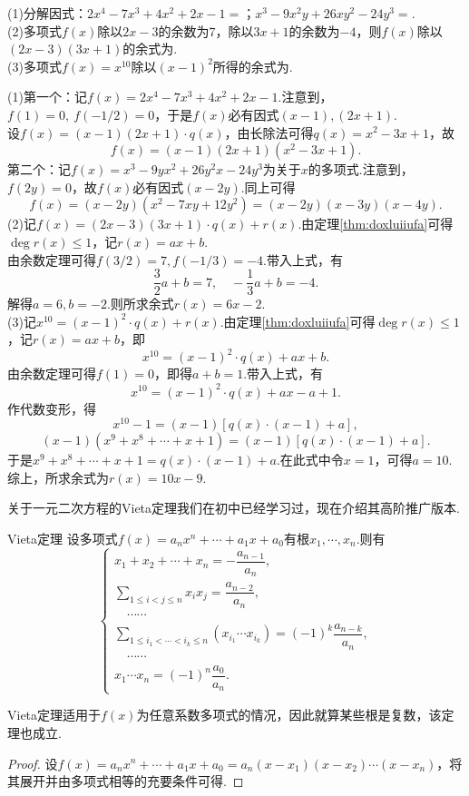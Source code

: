 \documentclass[lang=cn, zihao=5]{elegantbook}
\newcommand{\tk}{\uline{\hspace{4em}}}
\begin{document}
\begin{example}
	(1)分解因式：$2x^4-7x^3+4x^2+2x-1=$\tk ；$x^3-9x^2y+26xy^2-24y^3=$\tk . \\
	(2)多项式$f(x)$除以$2x-3$的余数为$7$，除以$3x+1$的余数为$-4$，则$f(x)$除以$(2x-3)(3x+1)$的余式为\tk . \\
	(3)多项式$f(x)=x^{10}$除以$(x-1)^2$所得的余式为\tk .
\end{example}
\begin{solution}
	(1)第一个：记$f(x)=2x^4-7x^3+4x^2+2x-1$.注意到，$f(1)=0,~f(-1/2)=0$，于是$f(x)$必有因式$(x-1),(2x+1)$. \\
	设$f(x)=(x-1)(2x+1) \cdot q(x)$，由长除法可得$q(x)=x^2-3x+1$，故$$f(x)=(x-1)(2x+1)(x^2-3x+1).$$
	第二个：记$f(x)=x^3-9yx^2+26y^2x-24y^3$为关于$x$的多项式.注意到，$f(2y)=0$，故$f(x)$必有因式$(x-2y)$.同上可得$$f(x)=(x-2y)(x^2-7xy+12y^2)=(x-2y)(x-3y)(x-4y).$$
	(2)记$f(x)=(2x-3)(3x+1) \cdot q(x) + r(x)$.由定理\ref{thm:doxluiiufa}可得$\deg r(x) \leq 1$，记$r(x)=ax+b$. \\
	由余数定理可得$f(3/2)=7,f(-1/3)=-4$.带入上式，有$$\frac{3}{2}a+b=7,\quad -\frac{1}{3}a+b=-4.$$
	解得$a=6,b=-2$.则所求余式$r(x)=6x-2$. \\
	(3)记$x^{10}=(x-1)^2 \cdot q(x) + r(x)$.由定理\ref{thm:doxluiiufa}可得$\deg r(x) \leq 1$，记$r(x)=ax+b$，即$$x^{10} = (x-1)^2 \cdot q(x) + ax+b.$$
	由余数定理可得$f(1)=0$，即得$a+b=1$.带入上式，有$$x^{10} = (x-1)^2 \cdot q(x) + ax-a+1.$$
	作代数变形，得
	$$x^{10}-1 = (x-1)[q(x) \cdot (x-1)+a],$$
	$$(x-1)(x^9+x^8+ \cdots +x+1) = (x-1)[q(x) \cdot (x-1)+a].$$
	于是$x^9+x^8+ \cdots +x+1 = q(x) \cdot (x-1)+a$.在此式中令$x=1$，可得$a=10$. \\
	综上，所求余式为$r(x)=10x-9$.
\end{solution}

关于一元二次方程的Vieta定理我们在初中已经学习过，现在介绍其高阶推广版本.

\begin{theorem}{Vieta定理}
	设多项式$f(x)=a_nx^n + \cdots + a_1x + a_0$有根$x_1, \cdots ,x_n$.则有$$\begin{cases}
		x_1+x_2+ \cdots + x_n=-\dfrac{a_{n-1}}{a_n}, \\
		{\displaystyle \sum_{1 \leq i < j \leq n} x_ix_j} = \dfrac{a_{n-2}}{a_n}, \\
		\quad \cdots \cdots \\
		{\displaystyle \sum_{1 \leq i_1 < \cdots < i_k \leq n} (x_{i_1} \cdots x_{i_k})} = (-1)^{k} \dfrac{a_{n-k}}{a_n}, \\
		\quad \cdots \cdots \\
		x_1 \cdots x_n = (-1)^{n} \dfrac{a_0}{a_n}.
	\end{cases}$$
\end{theorem}
\begin{remark}
	Vieta定理适用于$f(x)$为任意系数多项式的情况，因此就算某些根是复数，该定理也成立.
\end{remark}
\begin{proof}
	设$f(x)=a_nx^n + \cdots + a_1x + a_0=a_n(x-x_1)(x-x_2) \cdots (x-x_n)$，将其展开并由多项式相等的充要条件可得.
\end{proof}
\end{document}

